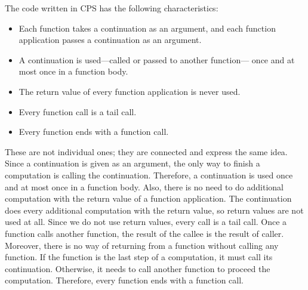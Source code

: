 The code written in CPS has the following characteristics:
\begin{itemize}
  \item Each function takes a continuation as an argument, and each function
    application passes a continuation as an argument.
  \item A continuation is used---called or passed to another function---
    once and at most once in a function body.
  \item The return value of every function application is never used.
  \item Every function call is a tail call.
  \item Every function ends with a function call.
\end{itemize}
These are not individual ones; they are connected and express the same idea.
Since a continuation is given as an argument, the only way to finish a
computation is calling the continuation. Therefore, a continuation is used
once and at most once in a function body. Also, there is no need to do additional
computation with the return value of a function application.
The continuation does every additional
computation with the return value, so return values are not used at all.
Since we do not use return
values, every call is a tail call. Once a function calls another
function, the result of the callee is the result of caller. Moreover, there is no
way of returning from a function without calling any function. If the function
is the last step of a computation, it must call its continuation. Otherwise,
it needs to call another function to proceed the computation. Therefore, every
function ends with a function call.




